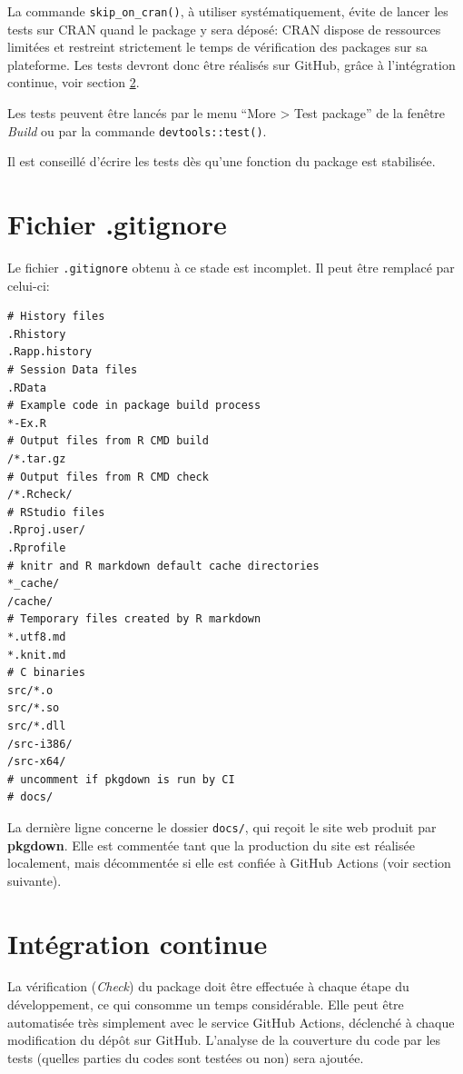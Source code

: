 \documentclass[
  12pt,
  french,
  a4paper,
  extrafontsizes,onecolumn,openright
  ]{memoir}
\begin{document}
La commande \texttt{skip\_on\_cran()}, à utiliser systématiquement, évite de lancer les tests sur CRAN quand le package y sera déposé: CRAN dispose de ressources limitées et restreint strictement le temps de vérification des packages sur sa plateforme.
Les tests devront donc être réalisés sur GitHub, grâce à l'intégration continue, voir section \ref{sec:package-ci5}.

Les tests peuvent être lancés par le menu \enquote{More \textgreater{} Test package} de la fenêtre \emph{Build} ou par la commande \texttt{devtools::test()}.

Il est conseillé d'écrire les tests dès qu'une fonction du package est stabilisée.

\hypertarget{fichier-.gitignore}{%
\section{Fichier .gitignore}\label{fichier-.gitignore}}

Le fichier \texttt{.gitignore} obtenu à ce stade est incomplet.
Il peut être remplacé par celui-ci:

\begin{verbatim}
# History files
.Rhistory
.Rapp.history
# Session Data files
.RData
# Example code in package build process
*-Ex.R
# Output files from R CMD build
/*.tar.gz
# Output files from R CMD check
/*.Rcheck/
# RStudio files
.Rproj.user/
.Rprofile
# knitr and R markdown default cache directories
*_cache/
/cache/
# Temporary files created by R markdown
*.utf8.md
*.knit.md
# C binaries
src/*.o
src/*.so
src/*.dll
/src-i386/
/src-x64/
# uncomment if pkgdown is run by CI
# docs/
\end{verbatim}

La dernière ligne concerne le dossier \texttt{docs/}, qui reçoit le site web produit par \textbf{pkgdown}.
Elle est commentée tant que la production du site est réalisée localement, mais décommentée si elle est confiée à GitHub Actions (voir section suivante).

\hypertarget{sec:package-ci5}{%
\section{Intégration continue}\label{sec:package-ci5}}

La vérification (\emph{Check}) du package doit être effectuée à chaque étape du développement, ce qui consomme un temps considérable.
Elle peut être automatisée très simplement avec le service GitHub Actions, déclenché à chaque modification du dépôt sur GitHub.
L'analyse de la couverture du code par les tests (quelles parties du codes sont testées ou non) sera ajoutée.
\end{document}

